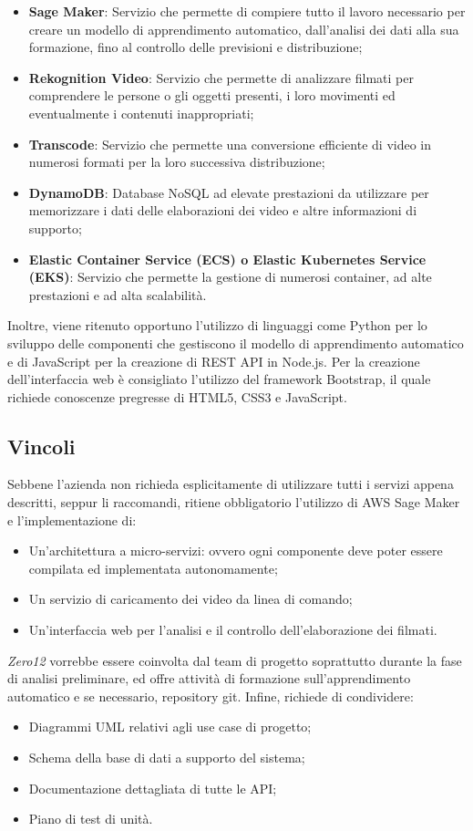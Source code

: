 \begin{itemize}
\item \textbf{Sage Maker}: Servizio che permette di compiere tutto il lavoro necessario per creare un modello di apprendimento automatico, dall'analisi dei dati alla sua formazione, fino al controllo delle previsioni e distribuzione;
\item \textbf{Rekognition Video}: Servizio che permette di analizzare filmati per comprendere le persone o gli oggetti presenti, i loro movimenti ed eventualmente i contenuti inappropriati;
\item \textbf{Transcode}: Servizio che permette una conversione efficiente di video in numerosi formati per la loro successiva distribuzione;
\item \textbf{DynamoDB}: Database NoSQL ad elevate prestazioni da utilizzare per memorizzare i dati delle elaborazioni dei video e altre informazioni di supporto;
\item \textbf{Elastic Container Service (ECS) o Elastic Kubernetes Service (EKS)}: Servizio che permette la gestione di numerosi container, ad alte prestazioni e ad alta scalabilità.
\end{itemize}
Inoltre, viene ritenuto opportuno l'utilizzo di linguaggi come Python per lo sviluppo delle componenti che gestiscono il modello di apprendimento automatico e di JavaScript per la creazione di REST API in Node.js. Per la creazione dell'interfaccia web \`e consigliato l'utilizzo del framework Bootstrap, il quale richiede conoscenze pregresse di HTML5, CSS3 e JavaScript.

\subsection{Vincoli}
Sebbene l'azienda non richieda esplicitamente di utilizzare tutti i servizi appena descritti, seppur li raccomandi, ritiene obbligatorio l'utilizzo di AWS Sage Maker e l'implementazione di:

\begin{itemize}
\item Un'architettura a micro-servizi: ovvero ogni componente deve poter essere compilata ed implementata autonomamente;
\item Un servizio di caricamento dei video da linea di comando;
\item Un'interfaccia web per l'analisi e il controllo dell'elaborazione dei filmati.
\end{itemize}
\textit{Zero12} vorrebbe essere coinvolta dal team di progetto soprattutto durante la fase di analisi preliminare, ed offre attività di formazione sull'apprendimento automatico e se necessario, repository git.
Infine, richiede di condividere:
\begin{itemize}
\item Diagrammi UML relativi agli use case di progetto;
\item Schema della base di dati a supporto del sistema;
\item Documentazione dettagliata di tutte le API;
\item Piano di test di unità.
\end{itemize}


